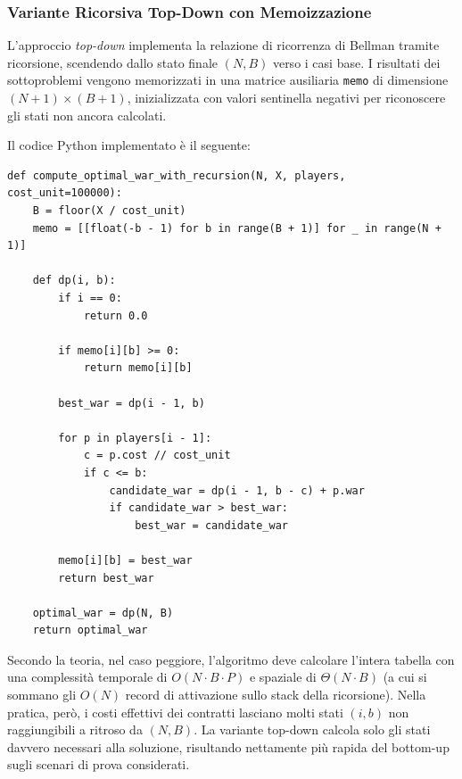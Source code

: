 \subsubsection{Variante Ricorsiva Top-Down con Memoizzazione}
L'approccio \textit{top-down} implementa la relazione di ricorrenza di Bellman tramite ricorsione, scendendo dallo stato finale $(N, B)$ verso i casi base. I risultati dei sottoproblemi vengono memorizzati in una matrice ausiliaria \texttt{memo} di dimensione $(N + 1) \times (B + 1)$, inizializzata con valori sentinella negativi per riconoscere gli stati non ancora calcolati.

Il codice Python implementato è il seguente:

\noindent\begin{minipage}{\linewidth}
\begin{lstlisting}
def compute_optimal_war_with_recursion(N, X, players, cost_unit=100000):
    B = floor(X / cost_unit)
    memo = [[float(-b - 1) for b in range(B + 1)] for _ in range(N + 1)]

    def dp(i, b):
        if i == 0:
            return 0.0

        if memo[i][b] >= 0:
            return memo[i][b]

        best_war = dp(i - 1, b)

        for p in players[i - 1]:
            c = p.cost // cost_unit
            if c <= b:
                candidate_war = dp(i - 1, b - c) + p.war
                if candidate_war > best_war:
                    best_war = candidate_war

        memo[i][b] = best_war
        return best_war

    optimal_war = dp(N, B)
    return optimal_war
\end{lstlisting}
\end{minipage}

Secondo la teoria, nel caso peggiore, l'algoritmo deve calcolare l'intera tabella con una complessità temporale di $O(N \cdot B \cdot P)$ e spaziale di $\Theta(N \cdot B)$ (a cui si sommano gli $O(N)$ record di attivazione sullo stack della ricorsione). Nella pratica, però, i costi effettivi dei contratti lasciano molti stati $(i, b)$ non raggiungibili a ritroso da $(N, B)$. La variante top-down calcola solo gli stati davvero necessari alla soluzione, risultando nettamente più rapida del bottom-up sugli scenari di prova considerati.

